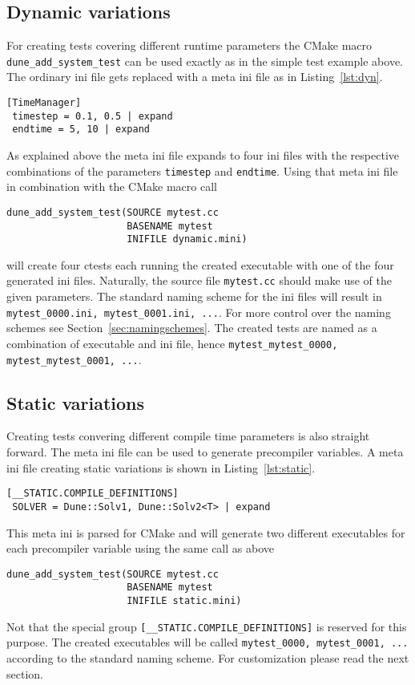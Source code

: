 \documentclass[11pt]{article}
\begin{document}
\subsection{Dynamic variations}
For creating tests covering different runtime parameters the CMake macro \lstinline!dune_add_system_test! can be used exactly
as in the simple test example above. The ordinary ini file gets replaced with a meta ini file as in Listing~\ref{lst:dyn}.
\begin{lstlisting}[caption={[dynamic.mini] An example of dynamic variations},label=lst:dyn]
 [TimeManager]
 timestep = 0.1, 0.5 | expand
 endtime = 5, 10 | expand
\end{lstlisting}
As explained above the meta ini file expands to four ini files with the respective combinations of the parameters \lstinline!timestep! and
\lstinline!endtime!. Using that meta ini file in combination with the CMake macro call
\begin{lstlisting}[caption={A CMakeLists.txt generating dynamic variations}]
dune_add_system_test(SOURCE mytest.cc
                     BASENAME mytest
                     INIFILE dynamic.mini)
\end{lstlisting}
will create four ctests each running the created executable with one of the four generated ini files. Naturally, the source file \lstinline!mytest.cc!
should make use of the given parameters. The standard naming scheme for the ini files will result in \lstinline!mytest_0000.ini, mytest_0001.ini, ...!.
For more control over the naming schemes see Section~\ref{sec:namingschemes}. The created tests are named as a combination of executable and ini file,
hence \lstinline!mytest_mytest_0000, mytest_mytest_0001, ...!.

\subsection{Static variations}
Creating tests convering different compile time parameters is also straight forward. The meta ini file can be used to generate precompiler
variables. A meta ini file creating static variations is shown in Listing~\ref{lst:static}.
\begin{lstlisting}[caption={[static.mini] An example of dynamic variations},label=lst:dyn]
 [__STATIC.COMPILE_DEFINITIONS]
 SOLVER = Dune::Solv1, Dune::Solv2<T> | expand
\end{lstlisting}
This meta ini is parsed for CMake and will generate two different executables for each precompiler variable using the same call as above
\begin{lstlisting}[caption={A CMakeLists.txt generating static variations with compile definitions}]
dune_add_system_test(SOURCE mytest.cc
                     BASENAME mytest
                     INIFILE static.mini)
\end{lstlisting}
Not that the special group \lstinline![__STATIC.COMPILE_DEFINITIONS]! is reserved for this purpose. The created executables will be called \lstinline!mytest_0000, mytest_0001, ...! according to the standard naming scheme. For customization
please read the next section.
\end{document}
